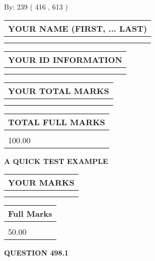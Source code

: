 \documentclass[12pt]{article}
\begin{document}
   
\hspace{1.0in} By: 
 239 ( 416 ,  613 )
   
   
   
   
\newpage 
\setcounter{page}{ 
   498001 } 
   
   
   
   
\noindent\begin{tabular}{|l|}
\hline
YOUR NAME (FIRST, ... LAST)  \\
\hline
 \\ 
 \\ 
\hline
\end{tabular}
\hspace{0.05in} \begin{tabular}{|l|}
\hline
 YOUR   ID   INFORMATION  \\
\hline
 \\ 
 \\ 
\hline
\end{tabular}
   
   
\vspace{0.2in}\noindent\begin{tabular}{|l|}
\hline
YOUR TOTAL MARKS  \\
\hline
 \\ 
 \\ 
\hline
\end{tabular}
\hspace{0.05in} \begin{tabular}{|l|}
\hline
TOTAL FULL MARKS  \\
\hline
 \\ 
100.00 \\
\hline
\end{tabular}
   
   
 \vspace{0.2in}
{\LARGE {\textbf{ A QUICK TEST EXAMPLE}}}
   
   
  
\vspace{0.2in}
  
\noindent\begin{tabular}{|l|}
\hline
 YOUR MARKS  \\
\hline
 \\ 
 \\ 
\hline
\end{tabular}
\hspace{0.05in} \begin{tabular}{|l|}
\hline
 Full Marks  \\
\hline
 \\ 
50.00 \\
\hline
\end{tabular}
{\textbf{\Large{QUESTION
498.1 
}}}
  
\end{document}

